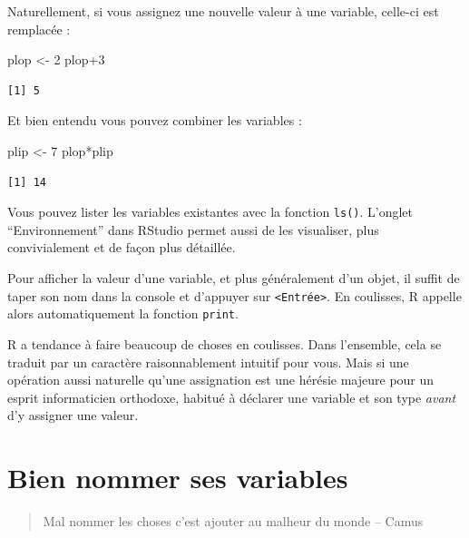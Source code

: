 \documentclass[
  letterpaper,
  DIV=11,
  numbers=noendperiod]{scrreprt}
\newenvironment{Shaded}{\begin{snugshade}}{\end{snugshade}}
\newcommand{\DecValTok}[1]{\textcolor[rgb]{0.68,0.00,0.00}{#1}}
\newcommand{\NormalTok}[1]{\textcolor[rgb]{0.00,0.23,0.31}{#1}}
\newcommand{\OtherTok}[1]{\textcolor[rgb]{0.00,0.23,0.31}{#1}}
\newcommand{\SpecialCharTok}[1]{\textcolor[rgb]{0.37,0.37,0.37}{#1}}
\begin{document}
Naturellement, si vous assignez une nouvelle valeur à une variable,
celle-ci est remplacée :

\begin{Shaded}
\begin{Highlighting}[]
\NormalTok{plop }\OtherTok{\textless{}{-}} \DecValTok{2}
\NormalTok{plop}\SpecialCharTok{+}\DecValTok{3}
\end{Highlighting}
\end{Shaded}

\begin{verbatim}
[1] 5
\end{verbatim}

Et bien entendu vous pouvez combiner les variables :

\begin{Shaded}
\begin{Highlighting}[]
\NormalTok{plip }\OtherTok{\textless{}{-}} \DecValTok{7}
\NormalTok{plop}\SpecialCharTok{*}\NormalTok{plip}
\end{Highlighting}
\end{Shaded}

\begin{verbatim}
[1] 14
\end{verbatim}

Vous pouvez lister les variables existantes avec la fonction
\texttt{ls()}. L'onglet ``Environnement'' dans RStudio permet aussi de
les visualiser, plus convivialement et de façon plus détaillée.

Pour afficher la valeur d'une variable, et plus généralement d'un objet,
il suffit de taper son nom dans la console et d'appuyer sur
\texttt{\textless{}Entrée\textgreater{}}. En coulisses, R appelle alors
automatiquement la fonction \texttt{print}.

R a tendance à faire beaucoup de choses en coulisses. Dans l'ensemble,
cela se traduit par un caractère raisonnablement intuitif pour vous.
Mais si une opération aussi naturelle qu'une assignation est une hérésie
majeure pour un esprit informaticien orthodoxe, habitué à déclarer une
variable et son type \emph{avant} d'y assigner une valeur.

\hypertarget{bien-nommer-ses-variables}{%
\section{Bien nommer ses variables}\label{bien-nommer-ses-variables}}

\begin{quote}
Mal nommer les choses c'est ajouter au malheur du monde -- Camus
\end{quote}
\end{document}
